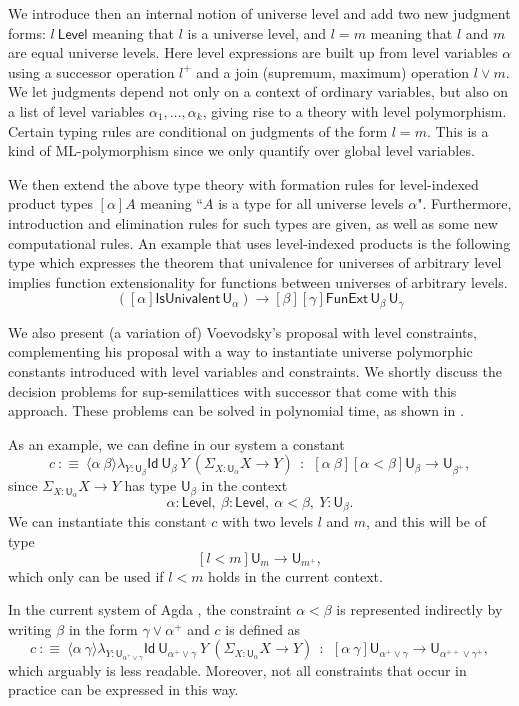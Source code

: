 \documentclass{easychair}
\newcommand{\Id}{\mathsf{Id}}
\newcommand{\lam}[2]{{\langle}#1{\rangle}#2}
\def\UU{\mathsf{U}}
\def\Level{\mathsf{Level}}
\begin{document}
  We introduce then an internal notion of universe level and
  add two new judgment forms: $l\ \Level$ meaning that $l$ is a universe level, 
  and $l = m$ meaning that $l$ and $m$ are equal universe levels. 
  Here level expressions are built up from level variables $\alpha$ 
  using a successor operation $l^+$ and 
  a join (supremum, maximum) operation $l \vee m$.
  We let judgments depend not only on a context of ordinary variables, 
  but also on a list of level variables $\alpha_1, \ldots, \alpha_k$, 
  giving rise to a theory with level polymorphism.
  Certain typing rules are conditional on judgments of the form $l=m$. 
  This is a kind of ML-polymorphism since we only quantify over global level variables. 
  
  We then extend the above type theory with formation rules for level-indexed product 
  types $[\alpha]A$ meaning ``$A$ is a type for all universe levels $\alpha$".
  Furthermore, introduction and elimination rules for such types are given,
  as well as some new computational rules. An example that uses level-indexed products 
  is the following type which  expresses the theorem that univalence for universes 
  of arbitrary level implies function extensionality for functions between 
  universes of arbitrary levels.
$$
([\alpha]\mathsf{IsUnivalent}\, \UU_\alpha)
\to [\beta][\gamma] \mathsf{FunExt}\, \UU_\beta\, \UU_\gamma
$$

We also present (a variation of) Voevodsky's proposal \cite{VV} with level constraints,
complementing his proposal with a way to instantiate universe polymorphic
constants introduced with level variables and constraints.
  We shortly discuss the decision problems for sup-semilattices with
  successor that come with this approach. These problems can be solved 
  in polynomial time, as shown in \cite{bezem-coquand:lattices}.
  
  \medskip
  
As an example, we can define in our system a constant
$$
c~:\equiv~\lam{\alpha~\beta}\lambda_{Y:\UU_{\beta}}\Id~{\UU_{\beta}}~Y~ (\Sigma_{X:\UU_{\alpha}}X\rightarrow Y)~~:~~
   [\alpha~\beta][\alpha<\beta]\UU_{\beta} \rightarrow \UU_{\beta^+},
$$
since $\Sigma_{X:\UU_{\alpha}}X\rightarrow Y$ has type $\UU_{\beta}$ in the context
   $$\alpha:\Level,~\beta:\Level,~\alpha<\beta,~Y:\UU_{\beta}.$$
We can instantiate this constant $c$ with two levels $l$ and $m$, 
   and this will be of type
   $$[l<m]\UU_{m} \rightarrow \UU_{m^+},$$
which only can be used if $l<m$ holds in the current context.

   \medskip

In the current system of Agda \cite{agda-manual}, 
the constraint $\alpha<\beta$ is represented indirectly by
writing $\beta$ in the form $\gamma\vee \alpha^+$ and $c$ is defined as
$$
c~:\equiv~\lam{\alpha~\gamma}\lambda_{Y:\UU_{\alpha^+\vee\gamma}}\Id~{\UU_{\alpha^+\vee\gamma}}~Y~ (\Sigma_{X:\UU_{\alpha}}X\rightarrow Y)~~:~~
   [\alpha~\gamma]\UU_{\alpha^+\vee\gamma} \rightarrow \UU_{\alpha^{++}\vee\gamma^+},
$$
   which arguably is less readable. Moreover, not all constraints that occur in practice
   can be expressed in this way.




\end{document}
